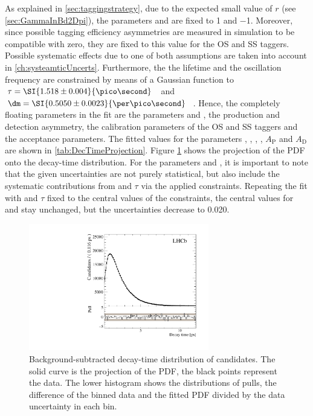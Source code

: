 As explained in \cref{sec:taggingstrategy}, due to the expected small value of $r$ (see \cref{sec:GammaInBd2Dpi}), the parameters \Cf and \Cfbar are fixed to \num{1} and \num{-1}.
Moreover, since possible tagging efficiency asymmetries are measured in simulation to be compatible with zero, they are fixed to this value for the OS and SS taggers.
Possible systematic effects due to one of both assumptions are taken into account in \cref{ch:systeamticUncerts}.
Furthermore, the the \Bz lifetime and the oscillation frequency are constrained by means of a Gaussian function to $\tau=\SI{1.518\pm0.004}{\pico\second}$~\cite{PDG2018} and $\dm=\SI{0.5050\pm0.0023}{\per\pico\second}$~\cite{Aaij:2016fdk}.
Hence, the completely floating parameters in the fit are the \CP parameters \Sf and \Sfbar, the production and detection asymmetry, the calibration parameters of the OS and SS taggers and the acceptance parameters.
The fitted values for the parameters \Sf, \Sfbar, \dm, \DG, $A_{\text{P}}$ and $A_{\text{D}}$ are shown in \cref{tab:DecTimeProjection}.
Figure \ref{fig:DecTimeProjection} shows the projection of the PDF onto the decay-time distribution.
For the \CP parameters \Sf and \Sfbar, it is important to note that the given uncertainties are not purely statistical, but also include the systematic contributions from \dm and $\tau$ via the applied constraints.
Repeating the fit with \dm and $\tau$ fixed to the central values of the constraints, the central values for \Sf and \Sfbar stay unchanged, but the uncertainties decrease to \num{0.020}.
\begin{figure}[tbp]
    \centering
    \includegraphics[width=0.7\textwidth]{10TimeFit/figs/BeautyTime_pull.pdf}
    \caption{Background-subtracted decay-time distribution of \BdToDpi candidates.
    The solid curve is the projection of the PDF, the black points represent the data.
    The lower histogram shows the distributions of pulls, \ie the difference of the binned data and the fitted PDF divided by the data uncertainty in each bin.}
    \label{fig:DecTimeProjection}
\end{figure}

